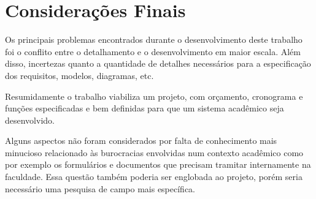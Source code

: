 
\chapter{Considerações Finais}

    \begin{comment}
        Prof. Dr. Ausberto S. Castro Vera
        UENF - CCT - LCMAT - Curso de Ciência da Computação
        Campos, RJ,  2022
        Disciplina: Análise e Projeto de Sistemas
        Aluno: João Vítor Fernandes Dias
    \end{comment}
    
    Os principais problemas encontrados durante o desenvolvimento deste trabalho foi o conflito entre o detalhamento e o desenvolvimento em maior escala. Além disso, incertezas quanto a quantidade de detalhes necessários para a especificação dos requisitos, modelos, diagramas, etc.
    
    Resumidamente o trabalho viabiliza um projeto, com orçamento, cronograma e funções especificadas e bem definidas para que um sistema acadêmico seja desenvolvido.
    
    Alguns aspectos não foram considerados por falta de conhecimento mais minucioso relacionado às burocracias envolvidas num contexto acadêmico como por exemplo os formulários e documentos que precisam tramitar internamente na faculdade. Essa questão também poderia ser englobada ao projeto, porém seria necessário uma pesquisa de campo mais específica.